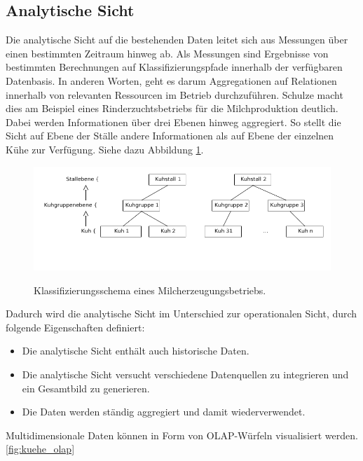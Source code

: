 \subsection{Analytische Sicht}
Die analytische Sicht auf die bestehenden Daten leitet sich aus Messungen über einen bestimmten Zeitraum hinweg ab. Als Messungen sind Ergebnisse von bestimmten Berechnungen auf Klassifizierungspfade innerhalb der verfügbaren Datenbasis. In anderen Worten, geht es darum Aggregationen auf Relationen innerhalb von relevanten Ressourcen im Betrieb durchzuführen. Schulze macht dies am Beispiel eines Rinderzuchtsbetriebs für die Milchproduktion deutlich. Dabei werden Informationen über drei Ebenen hinweg aggregiert. So stellt die Sicht auf Ebene der Ställe andere Informationen als auf Ebene der einzelnen Kühe zur Verfügung. Siehe dazu Abbildung \ref{fig:kuehe}. 

\begin{figure}[h]
 \includegraphics[scale=0.5,natwidth=\textwidth]{figures/datamodelling/kuehe.png}
 \centering
 \label{fig:kuehe}
 \caption{Klassifizierungsschema eines Milcherzeugungsbetriebs.}
\end{figure}

Dadurch wird die analytische Sicht im Unterschied zur operationalen Sicht, durch folgende Eigenschaften definiert:
\begin{itemize}
	\item Die analytische Sicht enthält auch historische Daten.
	\item Die analytische Sicht versucht verschiedene Datenquellen zu integrieren und ein Gesamtbild zu generieren.
	\item Die Daten werden ständig aggregiert und damit wiederverwendet.
\end{itemize}

Multidimensionale Daten können in Form von OLAP-Würfeln visualisiert werden.\ref{fig:kuehe_olap} 

